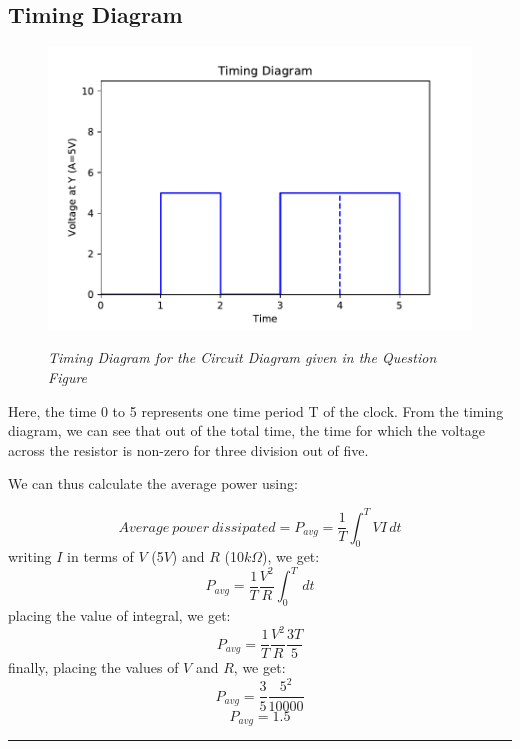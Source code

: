\documentclass[table,xcdraw]{article}
\begin{document}
\subsection{Timing Diagram}
\begin{figure}[h]
    \centering
    \resizebox{\columnwidth}{!} {
    \includegraphics{figs/graph.pdf} }
    \caption{\textit{Timing Diagram for the Circuit Diagram given in the Question Figure}}
    \label{fig:graph}
\end{figure}

Here, the time 0 to 5 represents one time period T of the clock. 
From the timing diagram, we can see that out of the total time, the time for which the voltage across the resistor is non-zero for three division out of five.\par
We can thus calculate the average power using:

\begin{equation}
    Average\:power\:dissipated = P_{avg}=\frac{1}{T}\int_{0}^{T} VI \,dt
\end{equation}
writing $I$ in terms of $V$ (5$V$) and $R$ (10$k\Omega$), we get:
\begin{equation}
    P_{avg}=\frac{1}{T}\frac{V^2}{R}\int_{0}^{T}\,dt
\end{equation}
placing the value of integral, we get:
\begin{equation}
    P_{avg}=\frac{1}{T}\frac{V^2}{R}\frac{3T}{5}
\end{equation}
finally, placing the values of $V$ and $R$, we get:
\begin{equation}
    P_{avg}=\frac{3}{5}\frac{5^2}{10000}
\end{equation}
\begin{equation}
    P_{avg}=1.5
\end{equation}
\vfill
\hrule
\end{document}
